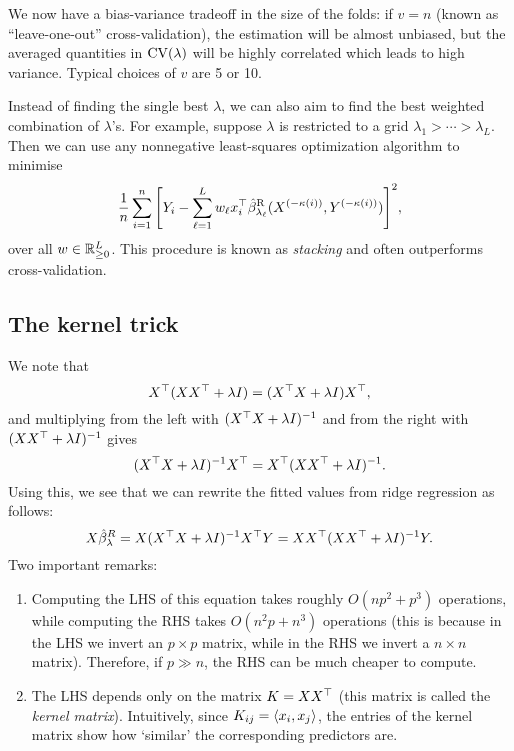 We now have a bias-variance tradeoff in the size of the folds: if $v = n$ (known as ``leave-one-out'' cross-validation), the estimation will be almost unbiased, but the averaged quantities in $\operatorname{CV}(\lambda)$ will be highly correlated which leads to high variance. Typical choices of $v$ are 5 or 10. 

Instead of finding the single best $\lambda$, we can also aim to find the best weighted combination of $\lambda$'s. For example, suppose $\lambda$ is restricted to a grid $\lambda_1 > \dotsb > \lambda_L$. Then we can use any nonnegative least-squares optimization algorithm to minimise 
\[
\frac1n \sum_{i=1}^n \qty[ Y_i - \sum_{\ell = 1}^L w_\ell x_i^\top \hat\beta_{\lambda_\ell}^\mathrm{R}(X^{(-\kappa(i))}, Y^{(-\kappa(i))})]^2,
\]
over all $w \in \mathbb R^L_{\geq 0}$. This procedure is known as \emph{stacking} and often outperforms cross-validation. 

\subsection{The kernel trick}
We note that 
\[
 X^\top (XX^\top + \lambda I) = (X^\top X + \lambda I) X^\top,
\]
and multiplying from the left with $(X^\top X + \lambda I)^{-1}$ and from the right with $(XX^\top + \lambda I)^{-1}$ gives
\[
(X^\top X + \lambda I)^{-1} X^\top = X^\top (XX^\top + \lambda I)^{-1}.
\]
Using this, we see that we can rewrite the fitted values from ridge regression as follows:
\[
X\hat\beta_\lambda^R = X(X^\top X + \lambda I)^{-1} X^\top Y = XX^\top (XX^\top + \lambda I)^{-1} Y.
\]
Two important remarks: 
\begin{enumerate}
    \item Computing the LHS of this equation takes roughly $O(np^2 + p^3)$ operations, while computing the RHS takes $O(n^2 p + n^3)$ operations (this is because in the LHS we invert an $p \times p$ matrix, while in the RHS we invert a $n \times n$ matrix). Therefore, if $p \gg n$, the RHS can be much cheaper to compute. 
    \item The LHS depends only on the matrix $K = XX^\top$ (this matrix is called the \emph{kernel matrix}). Intuitively, since $K_{ij} = \langle x_i, x_j\rangle$, the entries of the kernel matrix show how `similar' the corresponding predictors are. 
\end{enumerate}

